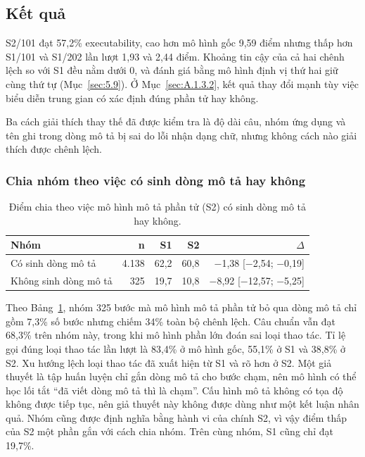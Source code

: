 \subsection{Kết quả}\label{sec:A.1.3}

S2/101 đạt 57,2\% executability, cao hơn mô hình gốc 9,59 điểm nhưng thấp hơn S1/101 và S1/202 lần lượt 1,93 và 2,44 điểm. Khoảng tin cậy của cả hai chênh lệch so với S1 đều nằm dưới 0, và đánh giá bằng mô hình định vị thứ hai giữ cùng thứ tự (Mục~\ref{sec:5.9}). Ở Mục~\ref{sec:A.1.3.2}, kết quả thay đổi mạnh tùy việc biểu diễn trung gian có xác định đúng phần tử hay không.

Ba cách giải thích thay thế đã được kiểm tra là độ dài câu, nhóm ứng dụng và tên ghi trong dòng mô tả bị sai do lỗi nhận dạng chữ, nhưng không cách nào giải thích được chênh lệch.

\subsubsection{Chia nhóm theo việc có sinh dòng mô tả hay không}\label{sec:A.1.3.1}

\begin{table}[htbp]
\centering\small
\caption{Điểm chia theo việc mô hình mô tả phần tử (S2) có sinh dòng mô tả hay không.}\label{tab:A.2}
\begin{tabular}{@{}lrrrr@{}}
\toprule
\textbf{Nhóm} & \textbf{n} & \textbf{S1} & \textbf{S2} & \textbf{$\Delta$} \\
\midrule
Có sinh dòng mô tả & 4.138 & 62,2 & 60,8 & $-$1,38 [$-$2,54; $-$0,19] \\
Không sinh dòng mô tả & 325 & 19,7 & 10,8 & $-$8,92 [$-$12,57; $-$5,25] \\
\bottomrule
\end{tabular}
\end{table}

Theo Bảng~\ref{tab:A.2}, nhóm 325 bước mà mô hình mô tả phần tử bỏ qua dòng mô tả chỉ gồm 7,3\% số bước nhưng chiếm 34\% toàn bộ chênh lệch. Câu chuẩn vẫn đạt 68,3\% trên nhóm này, trong khi mô hình phần lớn đoán sai loại thao tác. Tỉ lệ gọi đúng loại thao tác lần lượt là 83,4\% ở mô hình gốc, 55,1\% ở S1 và 38,8\% ở S2. Xu hướng lệch loại thao tác đã xuất hiện từ S1 và rõ hơn ở S2. Một giả thuyết là tập huấn luyện chỉ gắn dòng mô tả cho bước chạm, nên mô hình có thể học lối tắt “đã viết dòng mô tả thì là chạm”. Cấu hình mô tả không có tọa độ không được tiếp tục, nên giả thuyết này không được dùng như một kết luận nhân quả. Nhóm cũng được định nghĩa bằng hành vi của chính S2, vì vậy điểm thấp của S2 một phần gắn với cách chia nhóm. Trên cùng nhóm, S1 cũng chỉ đạt 19,7\%.

